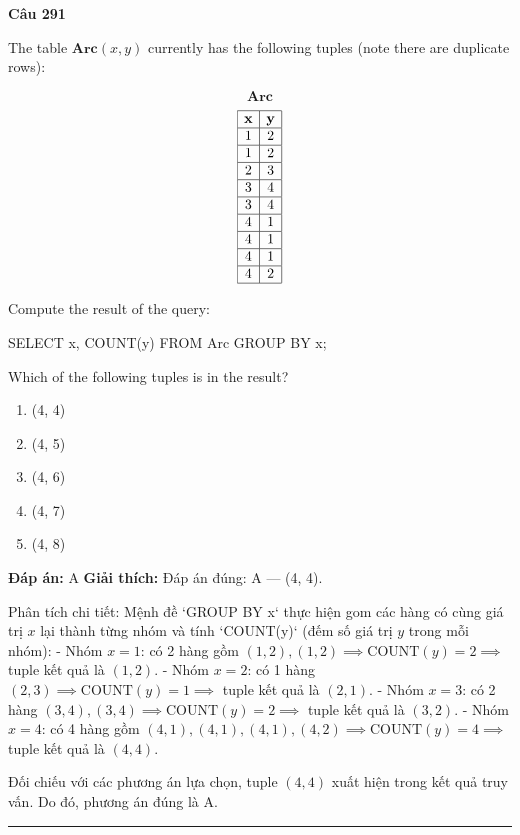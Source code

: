 \documentclass[11pt,a4paper]{article}
\newenvironment{question}[1]{%
  \par\vspace{1em}\noindent\textbf{\large Câu #1}\par\vspace{0.4em}
}{%
  \par\vspace{1em}\hrule\vspace{0.6em}
}
\newenvironment{choices}{%
  \begin{enumerate}[label=\textbf{\Alph*.},leftmargin=2.2em,itemsep=2pt,topsep=3pt]
}{%
  \end{enumerate}
}
\newcommand{\choice}{\item}
\newenvironment{codebox}{%
  \begin{tcolorbox}[colback=gray!8!white,colframe=gray!50!black,arc=1.5mm,boxrule=0.6pt,left=3mm,right=3mm,top=2.5mm,bottom=2.5mm]
  \ttfamily\small
}{%
  \end{tcolorbox}
}
\begin{document}
\begin{question}{291}
The table \(\textbf{Arc}(x, y)\) currently has the following tuples (note there are duplicate rows):

\[\textbf{Arc}\]
\[\begin{array}{|c|c|}
\hline
\textbf{x} & \textbf{y} \\
\hline
1 & 2 \\
\hline
1 & 2 \\
\hline
2 & 3 \\
\hline
3 & 4 \\
\hline
3 & 4 \\
\hline
4 & 1 \\
\hline
4 & 1 \\
\hline
4 & 1 \\
\hline
4 & 2 \\
\hline
\end{array}\]

Compute the result of the query:
\begin{codebox}
SELECT x, COUNT(y)
FROM Arc
GROUP BY x;
\end{codebox}

Which of the following tuples is in the result?
\begin{choices}
\choice (4, 4)
\choice (4, 5)
\choice (4, 6)
\choice (4, 7)
\choice (4, 8)
\end{choices}
\textbf{Đáp án:} A
\textbf{Giải thích:} Đáp án đúng: A — (4, 4).

Phân tích chi tiết:
Mệnh đề `GROUP BY x` thực hiện gom các hàng có cùng giá trị \(x\) lại thành từng nhóm và tính `COUNT(y)` (đếm số giá trị \(y\) trong mỗi nhóm):
- Nhóm \(x = 1\): có 2 hàng gồm \((1, 2), (1, 2) \implies \text{COUNT}(y) = 2 \implies\) tuple kết quả là \((1, 2)\).
- Nhóm \(x = 2\): có 1 hàng \((2, 3) \implies \text{COUNT}(y) = 1 \implies\) tuple kết quả là \((2, 1)\).
- Nhóm \(x = 3\): có 2 hàng \((3, 4), (3, 4) \implies \text{COUNT}(y) = 2 \implies\) tuple kết quả là \((3, 2)\).
- Nhóm \(x = 4\): có 4 hàng gồm \((4, 1), (4, 1), (4, 1), (4, 2) \implies \text{COUNT}(y) = 4 \implies\) tuple kết quả là \((4, 4)\).

Đối chiếu với các phương án lựa chọn, tuple \((4, 4)\) xuất hiện trong kết quả truy vấn.
Do đó, phương án đúng là A.
\end{question}
\end{document}
